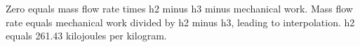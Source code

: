 Zero equals mass flow rate times h2 minus h3 minus mechanical work. 
Mass flow rate equals mechanical work divided by h2 minus h3, leading to interpolation. 
h2 equals 261.43 kilojoules per kilogram.